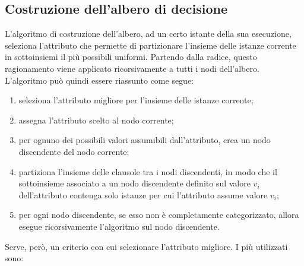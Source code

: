 \subsection{Costruzione dell'albero di decisione}
L'algoritmo di costruzione dell'albero, ad un certo istante della sua esecuzione, seleziona l'attributo che permette di partizionare l'insieme delle istanze corrente in sottoinsiemi il più possibili uniformi. Partendo dalla radice, questo ragionamento viene applicato ricorsivamente a tutti i nodi dell'albero.
L'algoritmo può quindi essere riassunto come segue:
\begin{enumerate}
    \item seleziona l'attributo migliore per l'insieme delle istanze corrente;
    \item assegna l'attributo scelto al nodo corrente;
    \item per ognuno dei possibili valori assumibili dall'attributo, crea un nodo discendente del nodo corrente;
    \item partiziona l'insieme delle clausole tra i nodi discendenti, in modo che il sottoinsieme associato a un nodo discendente definito sul valore $v_i$ dell'attributo contenga solo istanze per cui l'attributo assume valore $v_i$;
    \item per ogni nodo discendente, se esso non è completamente categorizzato, allora esegue ricorsivamente l'algoritmo sul nodo discendente.
\end{enumerate}
Serve, però, un criterio con cui selezionare l'attributo migliore. I più utilizzati sono:
